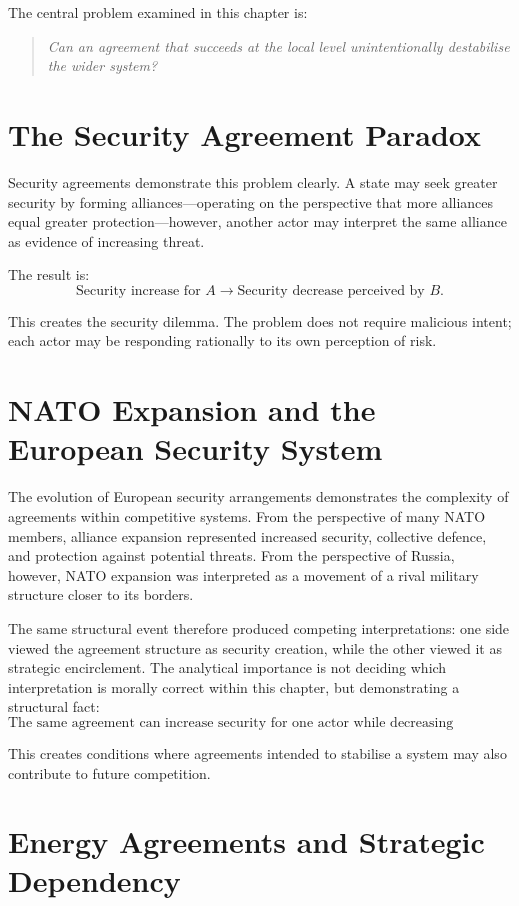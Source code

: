 \documentclass[11pt,openany]{book}
\theoremstyle{plain}
\theoremstyle{definition}
\begin{document}
The central problem examined in this chapter is:
\begin{quote}
\textit{Can an agreement that succeeds at the local level unintentionally destabilise the wider system?}
\end{quote}

\section*{The Security Agreement Paradox}

Security agreements demonstrate this problem clearly. A state may seek greater security by forming alliances—operating on the perspective that more alliances equal greater protection—however, another actor may interpret the same alliance as evidence of increasing threat.

The result is:
\[
\text{Security increase for } A
\longrightarrow
\text{Security decrease perceived by } B.
\]

This creates the security dilemma. The problem does not require malicious intent; each actor may be responding rationally to its own perception of risk.

\section*{NATO Expansion and the European Security System}

The evolution of European security arrangements demonstrates the complexity of agreements within competitive systems. From the perspective of many NATO members, alliance expansion represented increased security, collective defence, and protection against potential threats. From the perspective of Russia, however, NATO expansion was interpreted as a movement of a rival military structure closer to its borders.

The same structural event therefore produced competing interpretations: one side viewed the agreement structure as security creation, while the other viewed it as strategic encirclement. The analytical importance is not deciding which interpretation is morally correct within this chapter, but demonstrating a structural fact:
\[
\boxed{
\text{The same agreement can increase security for one actor while decreasing perceived security for another.}
}
\]

This creates conditions where agreements intended to stabilise a system may also contribute to future competition.

\section*{Energy Agreements and Strategic Dependency}
\end{document}
